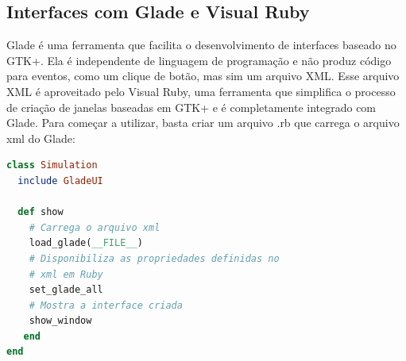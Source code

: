 \subsection{Interfaces com Glade e Visual Ruby}
Glade é uma ferramenta que facilita o desenvolvimento de interfaces baseado no GTK+. Ela é independente de linguagem de programação
e não produz código para eventos, como um clique de botão, mas sim um arquivo XML. Esse arquivo XML é aproveitado pelo Visual Ruby, uma ferramenta que simplifica 
o processo de criação de janelas baseadas em GTK+ e é completamente integrado com Glade.
Para começar a utilizar, basta criar um arquivo .rb que carrega o arquivo xml do Glade:

\begin{lstlisting}[language=Ruby, caption=simulation.rb]
class Simulation
  include GladeUI

  def show
    # Carrega o arquivo xml
    load_glade(__FILE__)
    # Disponibiliza as propriedades definidas no 
    # xml em Ruby
    set_glade_all
    # Mostra a interface criada
    show_window
   end
end
\end{lstlisting}

